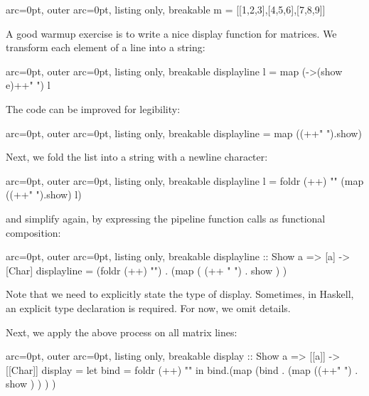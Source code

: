 \begin{tcblisting}{ arc=0pt, outer arc=0pt, listing only, breakable}
m = [[1,2,3],[4,5,6],[7,8,9]]

\end{tcblisting}


A good warmup exercise is to write a nice display function for matrices. We transform each element of a line into a string:


\begin{tcblisting}{ arc=0pt, outer arc=0pt, listing only, breakable}
displayline l = map (\e->(show e)++" ") l

\end{tcblisting}


The code can be improved for legibility:

\begin{tcblisting}{ arc=0pt, outer arc=0pt, listing only, breakable}
displayline = map ((++" ").show) 

\end{tcblisting}



Next, we fold the list into a string with a newline character: 


\begin{tcblisting}{ arc=0pt, outer arc=0pt, listing only, breakable}
displayline l = foldr (++) "\n" (map ((++" ").show) l)

\end{tcblisting}


and simplify again, by expressing the pipeline function calls as functional composition:

\begin{tcblisting}{ arc=0pt, outer arc=0pt, listing only, breakable}
displayline :: Show a => [a] -> [Char]
displayline = (foldr (++) "\n") .  (map ( (++ " ") . show ) )

\end{tcblisting}


Note that we need to explicitly state the type of display. Sometimes, in Haskell, an explicit type declaration is required. For now, we omit details.

Next, we apply the above process on all matrix lines:


\begin{tcblisting}{ arc=0pt, outer arc=0pt, listing only, breakable}
display :: Show a => [[a]] -> [[Char]]
display = 
    let bind = foldr (++) "\n"
    in bind.(map (bind . (map ((++" ") . show ) ) ) )

\end{tcblisting}


